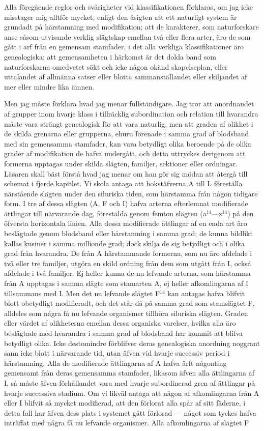 Alla föregående reglor och svårigheter vid klassifikationen förklaras, om jag icke misstager mig alltför mycket, enligt den åsigten att ett naturligt system är grundadt på härstamning med modifikation; att de karakterer, som naturforskare anse såsom utvisande verklig slägtskap emellan två eller flera arter, äro de som gått i arf från en gemensam stamfader, i det alla verkliga klassifikationer äro genealogiska; att gemensamheten i härkomst är det dolda band som naturforskarna omedvetet sökt och icke någon okänd skapelseplan, eller uttalandet af allmänna satser eller blotta sammanställandet eller skiljandet af mer eller mindre lika ämnen.

Men jag måste förklara hvad jag menar fullständigare. Jag tror att anordnandet af grupper inom hvarje klass i tillräcklig subordination och relation till hvarandra måste vara strängt genealogisk för att vara naturlig, men att graden af olikhet i de skilda grenarna eller grupperna, ehuru förenade i samma grad af blodsband med sin gemensamma stamfader, kan vara betydligt olika beroende på de olika grader af modifikation de hafva undergått, och detta uttryckes derigenom att formerna upptagas under skilda slägten, familjer, sektioner eller ordningar. Läsaren skall bäst förstå hvad jag menar om han gör sig mödan att återgå till schemat i fjerde kapitlet. Vi skola antaga att bokstäfverna A till L föreställa närstående slägten under den siluriska tiden, som härstamma från någon tidigare form. I tre af dessa slägten (A, F och I) hafva arterna efterlemnat modifierade ättlingar till närvarande dag, förestälda genom femton slägten (a${}^{14}$—z${}^{14}$) på den öfversta horizontala linien. Alla dessa modifierade ättlingar af en enda art äro beslägtade genom blodsband eller härstamning i samma grad; de kunna bildlikt kallas kusiner i samma millionde grad; dock skilja de sig betydligt och i olika grad från hvarandra. De från A härstammande formerna, som nu äro afdelade i två eller tre familjer, utgöra en skild ordning från dem som utgått från I, också afdelade i två familjer. Ej heller kunna de nu lefvande arterna, som härstamma från A upptagas i samma slägte som stamarten A, ej heller afkomlingarna af I tillsammans med I. Men det nu lefvande slägtet F${}^{14}$ kan antagas hafva blifvit blott obetydligt modifieradt, och det står då på samma grad som stamslägtet F, alldeles som några få nu lefvande organismer tillhöra siluriska slägten. Graden eller värdet af olikheterna emellan dessa organiska varelser, hvilka alla äro beslägtade med hvarandra i samma grad af blodsband har kommit att blifva betydligt olika. Icke destomindre förblifver deras genealogiska anordning noggrant sann icke blott i närvarande tid, utan äfven vid hvarje successiv period i härstamning. Alla de modifierade ättlingarna af A hafva ärft någonting gemensamt från deras gemensamma stamfader, likasom äfven alla ättlingarna af I, så måste äfven förhållandet vara med hvarje subordinerad gren af ättlingar på hvarje successiva stadium. Om vi likväl antaga att någon af afkomlingarna från A eller I blifvit så mycket modifierad, att den förlorat alla spår af sitt fäderne, i detta fall har äfven dess plats i systemet gått förlorad — något som tyckes hafva inträffat med några få nu lefvande organismer. Alla afkomlingarna af slägtet F 